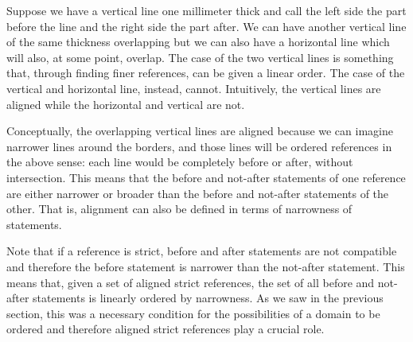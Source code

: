 \documentclass[11pt,letterpaper,fleqn]{memoir} %
\begin{document}
Suppose we have a vertical line one millimeter thick and call the left side the part before the line and the right side the part after. We can have another vertical line of the same thickness overlapping but we can also have a horizontal line which will also, at some point, overlap. The case of the two vertical lines is something that, through finding finer references, can be given a linear order. The case of the vertical and horizontal line, instead, cannot. Intuitively, the vertical lines are aligned while the horizontal and vertical are not.

Conceptually, the overlapping vertical lines are aligned because we can imagine narrower lines around the borders, and those lines will be ordered references in the above sense: each line would be completely before or after, without intersection. This means that the before and not-after statements of one reference are either narrower or broader than the before and not-after statements of the other. That is, alignment can also be defined in terms of narrowness of statements.

Note that if a reference is strict, before and after statements are not compatible and therefore the before statement is narrower than the not-after statement. This means that, given a set of aligned strict references, the set of all before and not-after statements is linearly ordered by narrowness. As we saw in the previous section, this was a necessary condition for the possibilities of a domain to be ordered and therefore aligned strict references play a crucial role.
\end{document}
